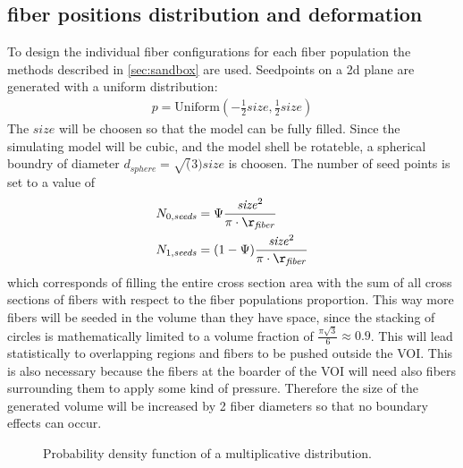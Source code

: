 \subsection{fiber positions distribution and deformation}
% 
To design the individual fiber configurations for each fiber population the methods described in \cref{sec:sandbox} are used.
Seedpoints on a 2d plane are generated with a uniform distribution:
\begin{align}
p = \mathrm{Uniform}(-\frac{1}{2}\mathit{size},\frac{1}{2}\mathit{size})
\end{align}
The $\mathit{size}$ will be choosen so that the model can be fully filled.
Since the simulating model will be cubic, and the model shell be rotateble, a spherical boundry of diameter $d_{\mathit{sphere}}=\sqrt(3) \mathit{size}$ is choosen.
The number of seed points is set to a value of 
\begin{align}
N_{0,\mathit{seeds}} &= \Psi \frac{\mathit{size}^2}{\pi \cdot \r_{\mathit{fiber}}}\\
N_{1,\mathit{seeds}} &= (1-\Psi) \frac{\mathit{size}^2}{\pi \cdot \r_{\mathit{fiber}}}
\end{align}
which corresponds of filling the entire cross section area with the sum of all cross sections of fibers with respect to the fiber populations proportion.
This way more fibers will be seeded in the volume than they have space, since the stacking of circles is mathematically limited to a volume fraction of $\frac{\pi \sqrt{3}}{6} \approx 0.9$.
This will lead statistically to overlapping regions and fibers to be pushed outside the \ac{VOI}.
This is also necessary because the fibers at the boarder of the \ac{VOI} will need also fibers surrounding them to apply some kind of pressure.
Therefore the size of the generated volume will be increased by 2 fiber diameters so that no boundary effects can occur.
\par
% 
\begin{figure}[!t]
\centering
\tikzset{external/export=false}
\caption[]{ Probability density function of a multiplicative  distribution.}
\label{fig:logNormal}
\end{figure}
